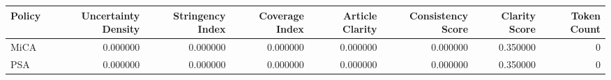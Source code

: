 \begin{tabular}{lrrrrrrr}
\toprule
Policy & Uncertainty Density & Stringency Index & Coverage Index & Article Clarity & Consistency Score & Clarity Score & Token Count \\
\midrule
MiCA & 0.000000 & 0.000000 & 0.000000 & 0.000000 & 0.000000 & 0.350000 & 0 \\
PSA & 0.000000 & 0.000000 & 0.000000 & 0.000000 & 0.000000 & 0.350000 & 0 \\
\bottomrule
\end{tabular}
